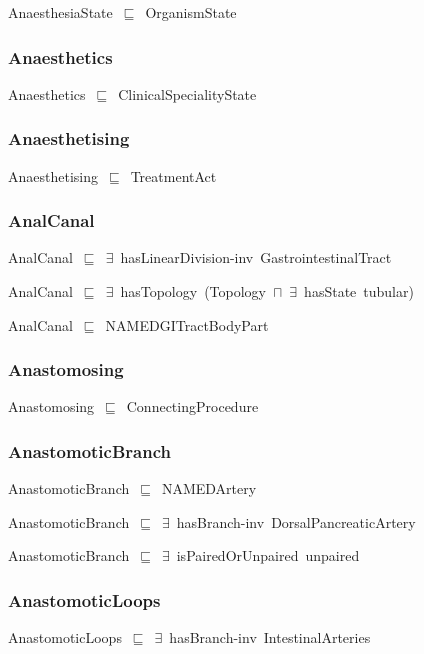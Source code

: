 \documentclass{article}
\begin{document}
AnaesthesiaState~\ensuremath{\sqsubseteq}~OrganismState~

\subsubsection*{Anaesthetics}

Anaesthetics~\ensuremath{\sqsubseteq}~ClinicalSpecialityState~

\subsubsection*{Anaesthetising}

Anaesthetising~\ensuremath{\sqsubseteq}~TreatmentAct~

\subsubsection*{AnalCanal}

AnalCanal~\ensuremath{\sqsubseteq}~\ensuremath{\exists}~hasLinearDivision-inv~GastrointestinalTract~

AnalCanal~\ensuremath{\sqsubseteq}~\ensuremath{\exists}~hasTopology~(Topology~\ensuremath{\sqcap}~\ensuremath{\exists}~hasState~tubular)~

AnalCanal~\ensuremath{\sqsubseteq}~NAMEDGITractBodyPart~

\subsubsection*{Anastomosing}

Anastomosing~\ensuremath{\sqsubseteq}~ConnectingProcedure~

\subsubsection*{AnastomoticBranch}

AnastomoticBranch~\ensuremath{\sqsubseteq}~NAMEDArtery~

AnastomoticBranch~\ensuremath{\sqsubseteq}~\ensuremath{\exists}~hasBranch-inv~DorsalPancreaticArtery~

AnastomoticBranch~\ensuremath{\sqsubseteq}~\ensuremath{\exists}~isPairedOrUnpaired~unpaired~

\subsubsection*{AnastomoticLoops}

AnastomoticLoops~\ensuremath{\sqsubseteq}~\ensuremath{\exists}~hasBranch-inv~IntestinalArteries~
\end{document}
